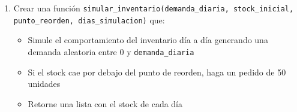 \documentclass[12pt]{article}
\begin{document}
\begin{enumerate}[label=\alph*)]
    \item Crear una función \texttt{simular\_inventario(demanda\_diaria, stock\_inicial, punto\_reorden, dias\_simulacion)} que:
    \begin{itemize}
        \item Simule el comportamiento del inventario día a día generando una demanda aleatoria entre 0 y \texttt{demanda\_diaria}
        \item Si el stock cae por debajo del punto de reorden, haga un pedido de 50 unidades
        \item Retorne una lista con el stock de cada día
    \end{itemize}
\end{enumerate}
\end{document}
